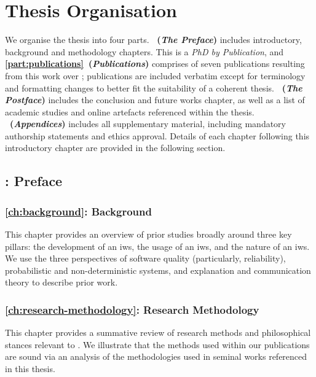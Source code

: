\section{Thesis Organisation}
\label{sec:introduction:organisation}

We organise the thesis into four parts. \textbf{~(\textit{The Preface})} includes introductory, background and methodology chapters. This is a \textit{PhD by Publication}, and \textbf{\cref{part:publications}~(\textit{Publications})} comprises of seven publications resulting from this work over ; publications are included verbatim except for terminology and formatting changes to better fit the suitability of a coherent thesis. \textbf{~(\textit{The Postface})} includes the conclusion and future works chapter, as well as a list of academic studies and online artefacts referenced within the thesis. \textbf{~(\textit{Appendices})} includes all supplementary material, including mandatory authorship statements and ethics approval. Details of each chapter following this introductory chapter are provided in the following section.

\subsection{: Preface}

\subsubsection{\cref{ch:background}: Background} This chapter provides an overview of prior studies broadly around three key pillars: the development of an \gls{iws}, the usage of an \gls{iws}, and the nature of an \gls{iws}. We use the three perspectives of software quality (particularly, reliability), probabilistic and non-deterministic systems, and explanation and communication theory to describe prior work.

\subsubsection{\cref{ch:research-methodology}: Research Methodology} This chapter provides a summative review of research methods and philosophical stances relevant to . We illustrate that the methods used within our publications are sound via an analysis of the methodologies used in seminal works referenced in this thesis.

